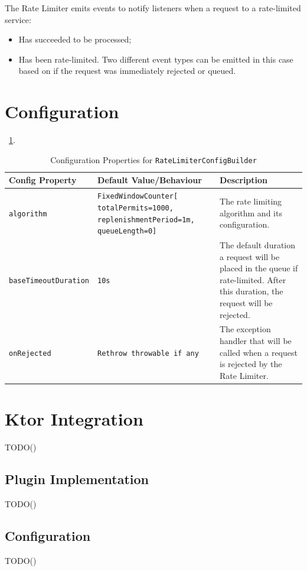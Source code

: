 The Rate Limiter emits events to notify listeners when a request to a rate-limited service:

\begin{itemize}
    \item Has succeeded to be processed;
    \item Has been rate-limited.
    Two different event types can be emitted in this case based on if the request was immediately rejected or queued.
\end{itemize}


\section{Configuration}\label{sec:rate-limiter-configuration}

~\ref{tab:ratelimiter-config-builder}.

\begin{table}[!htb]
    \centering
    \caption{Configuration Properties for \texttt{RateLimiterConfigBuilder}}
    \label{tab:ratelimiter-config-builder}
    \vspace{0.3cm}
    \begin{tabular}{|p{5cm}|p{5cm}|p{6cm}|}
        \hline
        \textbf{Config Property} & \textbf{Default Value/Behaviour}                                                       & \textbf{Description}                               \\ \hline
        \texttt{algorithm}       & \texttt{FixedWindowCounter[ totalPermits=1000, replenishmentPeriod=1m, queueLength=0]} & The rate limiting algorithm and its configuration.                                                                                                         \\ \hline
        \texttt{baseTimeoutDuration} & \texttt{10s} & The default duration a request will be placed in the queue
        if rate-limited.
        After this duration, the request will be rejected. \\ \hline
        \texttt{onRejected} & \texttt{Rethrow throwable
        if any} & The exception handler that will be called when a request is rejected by the Rate Limiter. \\ \hline
    \end{tabular}
\end{table}

\resilienceMechanismDefaultConfig


\section{Ktor Integration}\label{sec:rate-limiter-ktor-integration}

TODO()

\subsection{Plugin Implementation}\label{subsec:rate-limiter-plugin}

TODO()

\subsection{Configuration}\label{subsec:rate-limiter-configuration}

TODO()
